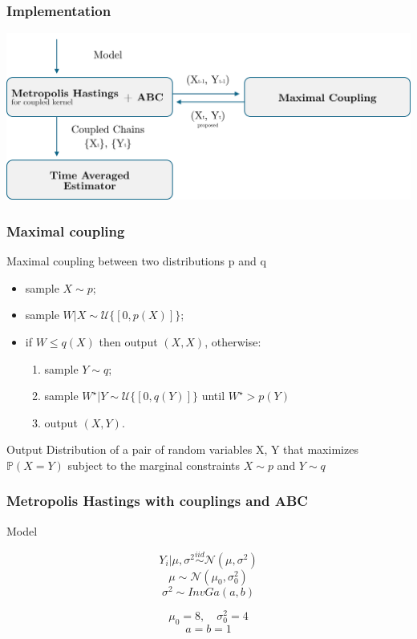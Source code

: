 \documentclass{beamer}
\begin{document}
	\begin{frame}
		\frametitle{Implementation}
		\begin{center}
			\includegraphics[width=\textwidth]{img/Bayes3}
		\end{center}
	\end{frame}
	\begin{frame}
	\frametitle{Maximal coupling}
	Maximal coupling between two distributions p and q 
	\begin{itemize}
		\item sample $X \sim p$;
		\item sample $W|X \sim \mathcal{U}\{[0,p(X)]\}$;
		\item if $W\leq q(X)$ then output $(X,X)$, otherwise:
		\begin{enumerate}
			\item sample $Y \sim q$;
			\item sample $W^\star | Y \sim \mathcal{U}\{[0, q(Y)]\}$ 
			until $W^\star > p(Y)$ 
			\item output $(X,Y)$.
		\end{enumerate}
	\end{itemize}
\begin{block}{Output}
		 Distribution of a pair of random variables X, Y that maximizes $\mathbb{P}(X=Y)$
		 subject to the marginal constraints $X \sim p$ and $Y \sim q$
	
\end{block}
\end{frame}
	\begin{frame}
		\frametitle{Metropolis Hastings with couplings and ABC}
		\begin{block}{Model}
				
				$$ Y_i | \mu, \sigma^2 \overset{iid}{\sim} \mathcal{N}(\mu, \sigma^2) $$
				$$ \mu  \sim \mathcal{N}(\mu_0, \sigma_0^2)  $$
				$$ \sigma^2  \sim InvGa(a,b) $$
				
			
		\end{block}
		$$ \mu_0 = 8, \quad \sigma^2_0 = 4$$
		$$ a=b=1 $$
		
	\end{frame}
\end{document}
